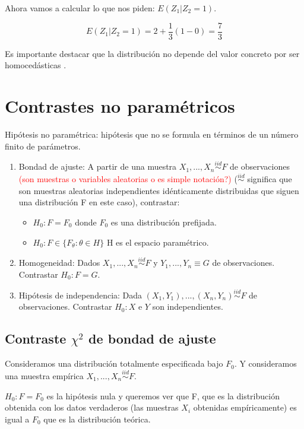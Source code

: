 \documentclass[nochap]{apuntes}
\begin{document}
\begin{example}
Ahora vamos a calcular lo que nos piden: $E(Z_1|Z_2=1)$.

\[E(Z_1|Z_2=1) = 2 + \frac{1}{3}(1-0) = \frac{7}{3}\]

Es importante destacar que la distribución no depende del valor concreto por ser homocedásticas .

\end{example}

\chapter{Contrastes no paramétricos}
Hipótesis no paramétrica: hipótesis que no se formula en términos de un número finito de parámetros.

\begin{enumerate}
\item Bondad de ajuste: A partir de una muestra $X_1,...,X_n \stackrel{iid}{\sim} F$ de observaciones \textcolor{red}{(son muestras o variables aleatorias o es simple notación?)} ($\stackrel{iid}{\sim}$ significa que son muestras aleatorias independientes idénticamente distribuidas que siguen una distribución F en este caso), contrastar:
\begin{itemize}
\item $H_0: F=F_0$ donde $F_0$ es una distribución prefijada.
\item $H_0: F \in \{F_{\theta} : \theta\in H\}$ H es el espacio paramétrico.
\end{itemize}
\item Homogeneidad: Dados $X_1,...,X_n \stackrel{iid}{\sim} F$ y $Y_1,...,Y_n \equiv G$ de observaciones. Contrastar $H_0: F=G$.
\item Hipótesis de independencia: Dada $(X_1,Y_1),...,(X_n,Y_n) \stackrel{iid}{\sim} F$ de observaciones. Contrastar $H_0: X$ e $Y$ son independientes.
\end{enumerate}

\section{Contraste $\chi^2$ de bondad de ajuste}
Consideramos una distribución totalmente especificada bajo $F_0$. Y consideramos una muestra empírica $X_1,...,X_n \stackrel{iid}{\sim} F$.

$H_0: F=F_0$ es la hipótesis nula y queremos ver que F, que es la distribución obtenida con los datos verdaderos (las muestras $X_i$ obtenidas empíricamente) es igual a $F_0$ que es la distribución teórica.
\end{document}
